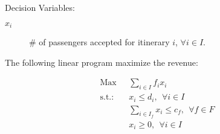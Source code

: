 \bigskip Decision Variables: \\
\begin{description}
\item[$x_i$] \# of passengers accepted for itinerary $i$, $\forall i \in I$.
\end{description}

The following linear program maximize the revenue:

\begin{align*}
\mbox{Max~~} & \sum_{i \in I} f_i x_i  \\
\mbox{s.t.:~~} 
& x_i \le d_i,~~ \forall i \in I  \\
& \sum_{i \in I_f} x_i \le c_f,~~ \forall f \in F \\
&  x_i \ge 0,~~ \forall i \in I 
\end{align*}



